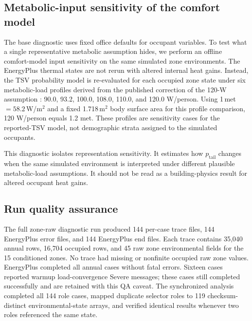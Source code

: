 \subsection{Metabolic-input sensitivity of the comfort model}

The base diagnostic uses fixed office defaults for occupant variables. To test what a single representative metabolic assumption hides, we perform an offline comfort-model input sensitivity on the same simulated zone environments. The EnergyPlus thermal states are not rerun with altered internal heat gains. Instead, the TSV probability model is re-evaluated for each occupied zone state under six metabolic-load profiles derived from the published correction of the 120-W assumption \citep{Guo2025Correcting120W}: 90.0, 93.2, 100.0, 108.0, 110.0, and 120.0 W/person. Using 1\,met${}=58.2$\,W/m$^2$ and a fixed 1.718\,m$^2$ body surface area for this profile comparison, 120 W/person equals 1.2 met. These profiles are sensitivity cases for the reported-TSV model, not demographic strata assigned to the simulated occupants.

This diagnostic isolates representation sensitivity. It estimates how $p_{\mathrm{tail}}$ changes when the same simulated environment is interpreted under different plausible metabolic-load assumptions. It should not be read as a building-physics result for altered occupant heat gains.

\subsection{Run quality assurance}

The full zone-raw diagnostic run produced 144 per-case trace files, 144 EnergyPlus error files, and 144 EnergyPlus end files. Each trace contains 35{,}040 annual rows, 16{,}704 occupied rows, and 45 raw zone environmental fields for the 15 conditioned zones. No trace had missing or nonfinite occupied raw zone values. EnergyPlus completed all annual cases without fatal errors. Sixteen cases reported warmup load-convergence Severe messages; these cases still completed successfully and are retained with this QA caveat. The synchronized analysis completed all 144 role cases, mapped duplicate selector roles to 119 checksum-distinct environmental-state arrays, and verified identical results whenever two roles referenced the same state.
